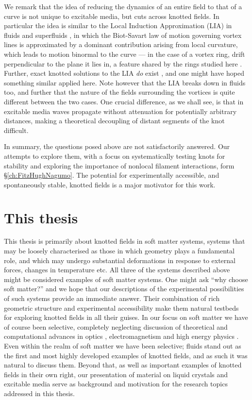 We remark that the idea of reducing the dynamics of an entire field to that of a curve is not unique to excitable media, but cuts across knotted fields. In particular the idea is similar to the Local Induction Approximation (LIA) in fluids and superfluids \citep{Saffman1992}, in which the Biot-Savart law of motion governing vortex lines is approximated by a dominant contribution arising from local curvature, which leads to motion binormal to the curve --- in the case of a vortex ring, drift perpendicular to the plane it lies in, a feature shared by the rings studied here \citep{Winfree1990}. Further, exact knotted solutions to the LIA \emph{do} exist \citep{Hasimoto1972,Kida1981}, and one might have hoped something similar applied here. Note however that the LIA breaks down in fluids too, and further that the nature of the fields surrounding the vortices is quite different between the two cases. One crucial difference, as we shall see, is that in excitable media waves propagate without attenuation for potentially arbitrary distances, making a theoretical decoupling of distant segments of the knot difficult. 

In summary, the questions posed above are not satisfactorily answered. Our attempts to explore them, with a focus on systematically testing knots for stability and exploring the importance of nonlocal filament interactions, form \S \ref{ch:FitzHughNagumo}. The potential for experimentally accessible, and spontaneously stable, knotted fields is a major motivator for this work.

\section{This thesis}

This thesis is primarily about knotted fields in soft matter systems, systems that may be loosely characterised as those in which geometry plays a fundamental role, and which may undergo substantial deformations in response to external forces, changes in temperature etc. All three of the systems described above might be considered examples of soft matter systems. One might ask ``why choose soft matter?'' and we hope that our descriptions of the experimental possibilities of such systems provide an immediate answer. Their combination of rich geometric structure and experimental accessibility make them natural testbeds for exploring knotted fields in all their guises. In our focus on soft matter we have of course been selective, completely neglecting discussion of theoretical and computational advances in optics \citep{Bode2017,Dennis2017}, electromagnetism \citep{Ranada1989, Ranada1990, Ranada1992,Irvine2010,Kedia2013,Kedia2016,Arrayas2017,Kedia2018} and high energy physics \citep{Faddeev1997, Houghton1998,Battye1998,Battye1999, Sutcliffe2007}. Even within the realm of soft matter we have been selective; fluids stand out as the first and most highly developed examples of knotted fields, and as such it was natural to discuss them. Beyond that, as well as important examples of knotted fields in their own right, our presentation of material on liquid crystals and excitable media serve as background and motivation for the research topics addressed in this thesis.

